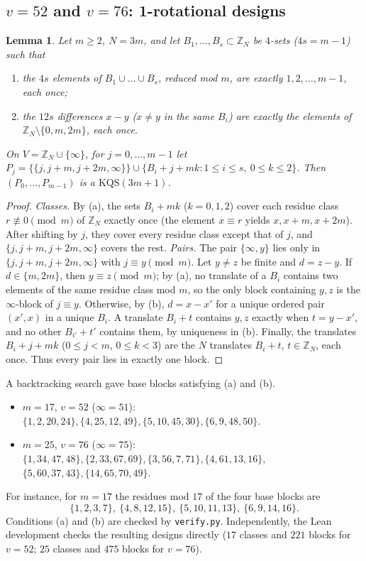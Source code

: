 \documentclass[11pt]{article}
\newtheorem{lemma}[theorem]{Lemma}
\theoremstyle{definition}
\theoremstyle{remark}
\begin{document}
\subsection{\texorpdfstring{$v=52$ and $v=76$}{v=52 and v=76}: 1-rotational designs}
\begin{lemma}\label{lem:rot}
Let $m\ge2$, $N=3m$, and let $B_1,\dots,B_s\subset\mathbb Z_N$ be $4$-sets ($4s=m-1$) such that
\begin{enumerate}
\item[(a)] the $4s$ elements of $B_1\cup\dots\cup B_s$, reduced mod $m$, are exactly
$1,2,\dots,m-1$, each once;
\item[(b)] the $12s$ differences $x-y$ ($x\ne y$ in the same $B_i$) are exactly the elements of
$\mathbb Z_N\setminus\{0,m,2m\}$, each once.
\end{enumerate}
On $V=\mathbb Z_N\cup\{\infty\}$, for $j=0,\dots,m-1$ let
$P_j=\bigl\{\{j,j+m,j+2m,\infty\}\bigr\}\cup\{B_i+j+mk: 1\le i\le s,\ 0\le k\le2\}$.
Then $(P_0,\dots,P_{m-1})$ is a $\mathrm{KQS}(3m+1)$.
\end{lemma}
\begin{proof}
\emph{Classes.} By (a), the sets $B_i+mk$ ($k=0,1,2$) cover each residue class $r\not\equiv0\pmod m$
of $\mathbb Z_N$ exactly once (the element $x\equiv r$ yields $x,x+m,x+2m$). After shifting by
$j$, they cover every residue class except that of $j$, and $\{j,j+m,j+2m,\infty\}$ covers the rest.
\emph{Pairs.} The pair $\{\infty,y\}$ lies only in $\{j,j+m,j+2m,\infty\}$ with $j\equiv y\pmod m$.
Let $y\ne z$ be finite and $d=z-y$. If $d\in\{m,2m\}$, then $y\equiv z\pmod m$; by (a), no
translate of a $B_i$ contains two elements of the same residue class mod $m$, so the only block
containing $y,z$ is the $\infty$-block of $j\equiv y$. Otherwise, by (b), $d=x-x'$ for a unique
ordered pair $(x',x)$ in a unique $B_i$. A translate $B_i+t$ contains $y,z$ exactly when
$t=y-x'$, and no other $B_{i'}+t'$ contains them, by uniqueness in (b). Finally, the translates
$B_i+j+mk$ ($0\le j<m$, $0\le k<3$) are the $N$ translates $B_i+t$, $t\in\mathbb Z_N$, each
once. Thus every pair lies in exactly one block.
\end{proof}
A backtracking search gave base blocks satisfying (a) and (b).
\begin{itemize}
\item $m=17$, $v=52$ ($\infty=51$): $\{1,2,20,24\},\{4,25,12,49\},\{5,10,45,30\},\{6,9,48,50\}$.
\item $m=25$, $v=76$ ($\infty=75$): $\{1,34,47,48\},\{2,33,67,69\},\{3,56,7,71\},\{4,61,13,16\},$
$\{5,60,37,43\},\{14,65,70,49\}$.
\end{itemize}
For instance, for $m=17$ the residues mod $17$ of the four base blocks are
\[\{1,2,3,7\},\ \{4,8,12,15\},\ \{5,10,11,13\},\ \{6,9,14,16\}.\]
Conditions (a) and (b) are checked by
\texttt{verify.py}. Independently, the Lean development checks the resulting designs directly
($17$ classes and $221$ blocks for $v=52$; $25$ classes and $475$ blocks for $v=76$).
\end{document}
